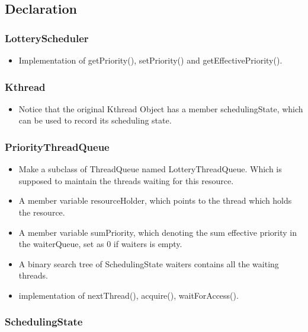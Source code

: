 \documentclass{article}
\begin{document}
	\subsection{Declaration}
	\subsubsection{LotteryScheduler}
	
	\begin{itemize}
		\item Implementation of getPriority(), setPriority() and getEffectivePriority().
	\end{itemize}
	
	\subsubsection{Kthread}
	
	\begin{itemize}
		\item Notice that the original Kthread Object has a member schedulingState, which can be used to record its scheduling state.
	\end{itemize}
	\subsubsection{PriorityThreadQueue}
	
	\begin{itemize}
		\item Make a subclass of ThreadQueue named LotteryThreadQueue. Which is supposed to maintain the threads waiting for this resource.
		
		\item A member variable resourceHolder, which points to the thread which holds the resource.
		
		\item A member variable sumPriority, which denoting the sum effective priority in the waiterQueue, set as 0 if waiters is empty.
		
		\item A binary search tree of SchedulingState waiters contains all the waiting threads.
		
		\item implementation of nextThread(), acquire(), waitForAccess().
	\end{itemize}
	
	\subsubsection{SchedulingState}
	
\end{document}
